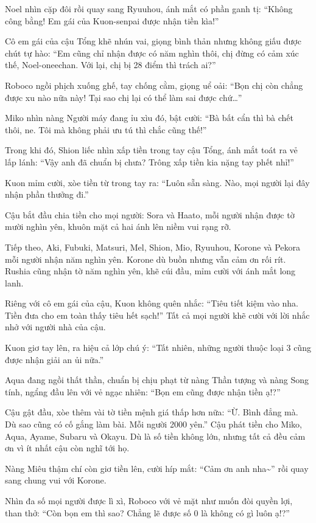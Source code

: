 \documentclass[../main.tex]{subfiles}
\begin{document}
Noel nhìn cặp đôi rồi quay sang Ryuuhou, ánh mắt có phần ganh tị: ``Không công bằng! Em gái của Kuon-senpai được nhận tiền kìa!''

Cô em gái của cậu Tổng khẽ nhún vai, giọng bình thản nhưng không giấu được chút tự hào: ``Em cũng chỉ nhận được có năm nghìn thôi, chị đừng có cảm xúc thế, Noel-oneechan. Với lại, chị bị 28 điểm thì trách ai?''

Roboco ngồi phịch xuống ghế, tay chống cằm, giọng uể oải: ``Bọn chị còn chẳng được xu nào nữa này! Tại sao chị lại có thể làm sai được chứ\dots''

Miko nhìn nàng Người máy đang ỉu xìu đó, bật cười: ``Bà bất cẩn thì bà chết thôi, ne. Tôi mà không phải ưu tú thì chắc cũng thế!''

Trong khi đó, Shion liếc nhìn xấp tiền trong tay cậu Tổng, ánh mắt toát ra vẻ lấp lánh: ``Vậy anh đã chuẩn bị chưa? Trông xấp tiền kia nặng tay phết nhỉ!''

Kuon mỉm cười, xòe tiền từ trong tay ra: ``Luôn sẵn sàng. Nào, mọi người lại đây nhận phần thưởng đi.''

Cậu bắt đầu chia tiền cho mọi người: Sora và Haato, mỗi người nhận được tờ mười nghìn yên, khuôn mặt cả hai ánh lên niềm vui rạng rỡ.

Tiếp theo, Aki, Fubuki, Matsuri, Mel, Shion, Mio, Ryuuhou, Korone và Pekora mỗi người nhận năm nghìn yên. Korone dù buồn nhưng vẫn cảm ơn rối rít. Rushia cũng nhận tờ năm nghìn yên, khẽ cúi đầu, mỉm cười với ánh mắt long lanh.

Riêng với cô em gái của cậu, Kuon không quên nhắc: ``Tiêu tiết kiệm vào nha. Tiền đưa cho em toàn thấy tiêu hết sạch!'' Tất cả mọi người khẽ cười với lời nhắc nhở với người nhà của cậu.

Kuon giơ tay lên, ra hiệu cả lớp chú ý: ``Tất nhiên, những người thuộc loại 3 cũng được nhận giải an ủi nữa.''

Aqua đang ngồi thất thần, chuẩn bị chịu phạt từ nàng Thần tượng và nàng Song tính, ngẩng đầu lên với vẻ ngạc nhiên: ``Bọn em cũng được nhận tiền ạ!?''

Cậu gật đầu, xòe thêm vài tờ tiền mệnh giá thấp hơn nữa: ``Ừ. Bình đẳng mà. Dù sao cũng có cố gắng làm bài. Mỗi người 2000 yên.'' Cậu phát tiền cho Miko, Aqua, Ayame, Subaru và Okayu. Dù là số tiền không lớn, nhưng tất cả đều cảm ơn vì ít nhất cậu còn nghĩ tới họ.

Nàng Miêu thậm chí còn giơ tiền lên, cười híp mắt: ``Cảm ơn anh nha\~{}'' rồi quay sang chung vui với Korone.

Nhìn đa số mọi người được lì xì, Roboco với vẻ mặt như muốn đòi quyền lợi, than thở: ``Còn bọn em thì sao? Chẳng lẽ được số 0 là không có gì luôn ạ!?''
\end{document}
